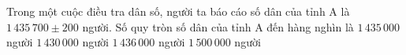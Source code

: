 \begin{ex}%
	Trong một cuộc điều tra dân số, người ta báo cáo số dân của tỉnh A là $1\,435\,700\pm 200$ người. Số quy tròn số dân của tỉnh A đến hàng nghìn là
	\choice
		{$1\,435\,000$ người}
		{$1\,430\,000$ người}
		{\True $1\,436\,000$ người}
		{$1\,500\,000$ người}
\end{ex}
